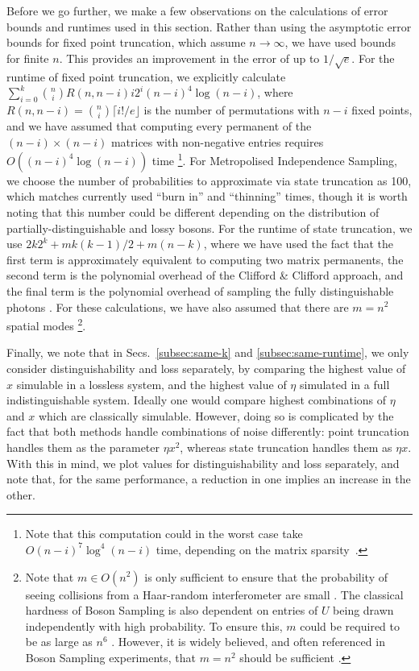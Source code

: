 Before we go further, we make a few observations on the calculations of error bounds and runtimes used in this section. 
Rather than using the asymptotic error bounds for fixed point truncation, which assume $n\rightarrow\infty$, we have used bounds for finite $n$. 
This provides an improvement in the error of up to $1/\sqrt{e}$. 
For the runtime of fixed point truncation, we explicitly calculate $\sum_{i=0}^k\binom{n}{i}R(n,n-i)i2^i(n-i)^4\log(n-i)$, where $R(n,n-i)=\binom{n}{i}\lceil i!/e\rfloor$ is the number of permutations with $n-i$ fixed points, and we have assumed that computing every permanent of the $(n-i)\times(n-i)$ matrices with non-negative entries requires $O((n-i)^4\log(n-i))$ time
\footnote{Note that this computation could in the worst case take $O(n-i)^7\log^4(n-i)$ time, depending on the matrix sparsity~\cite{huber2008}.}. 
For Metropolised Independence Sampling, we choose the number of probabilities to approximate via state truncation as 100, which matches currently used ``burn in'' and ``thinning'' times\cite{neville2017}, though it is worth noting that this number could be different depending on the distribution of partially-distinguishable and lossy bosons. 
For the runtime of state truncation, we use $2k2^k + mk(k-1)/2 + m(n-k)$, where we have used the fact that the first term is approximately equivalent to computing two matrix permanents, the second term is the polynomial overhead of the Clifford \& Clifford approach, and the final term is the polynomial overhead of sampling the fully distinguishable photons \cite{clifford2017}. 
For these calculations, we have also assumed that there are $m=n^2$ spatial modes
\footnote{Note that $m\in O(n^2)$ is only sufficient to ensure that the probability of seeing collisions from a Haar-random interferometer are small \cite{arkhipov2011}. 
The classical hardness of Boson Sampling is also dependent on entries of $U$ being drawn independently with high probability. 
To ensure this, $m$ could be required to be as large as $n^6$ \cite{aaronson2011}. 
However, it is widely believed, and often referenced in Boson Sampling experiments, that $m=n^2$ should be sufficient \cite{aaronson2011,broome2013, spring2013, tillmann2013, crespi2013,carolan2015,wang2017,zhong2018}.}.

Finally, we note that in Secs.\ \ref{subsec:same-k} and \ref{subsec:same-runtime}, we only consider distinguishability and loss separately, by comparing the highest value of $x$ simulable in a lossless system, and the highest value of $\eta$ simulated in a full indistinguishable system. 
Ideally one would compare highest combinations of $\eta$ and $x$ which are classically simulable. 
However, doing so is complicated by the fact that both methods handle combinations of noise differently: point truncation handles them as the parameter $\eta x^2$, whereas state truncation handles them as $\eta x$. 
With this in mind, we plot values for distinguishability and loss separately, and note that, for the same performance, a reduction in one implies an increase in the other.


